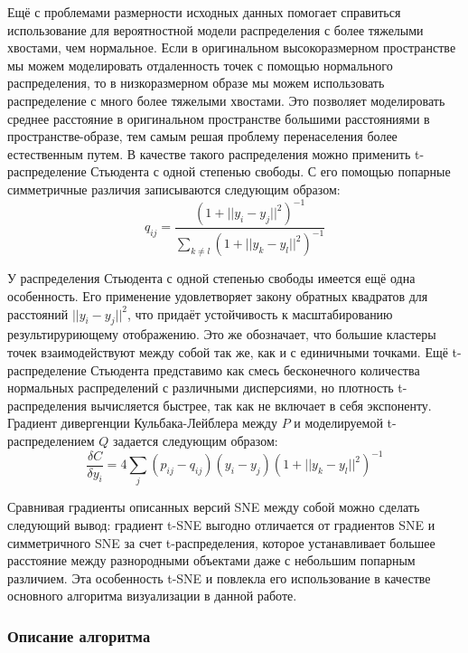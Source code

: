 Ещё с проблемами размерности исходных данных помогает справиться использование для вероятностной модели распределения с более тяжелыми хвостами, чем нормальное. Если в оригинальном высокоразмерном пространстве мы можем моделировать отдаленность точек с помощью нормального распределения, то в низкоразмерном образе мы можем использовать распределение с много более тяжелыми хвостами. Это позволяет моделировать среднее расстояние в оригинальном пространстве большими расстояниями в пространстве-образе, тем самым решая проблему перенаселения более естественным путем. В качестве такого распределения можно применить t-распределение Стьюдента с одной степенью свободы. С его помощью попарные симметричные различия записываются следующим образом:
\begin{equation}
	q_{ij} = \frac{(1 + ||y_i - y_j||^2)^{-1}}{\sum_{k \neq l} (1 + ||y_k - y_l||^2)^{-1}}
\end{equation}

У распределения Стьюдента с одной степенью свободы имеется ещё одна особенность. Его применение удовлетворяет закону обратных квадратов для расстояний $||y_i - y_j||^2$, что придаёт устойчивость к масштабированию результируриющему отображению. Это же обозначает, что большие кластеры точек взаимодействуют между собой так же, как и с единичными точками. Ещё t-распределение Стьюдента представимо как смесь бесконечного количества нормальных распределений с различными дисперсиями, но плотность t-распределения вычисляется быстрее, так как не включает в себя экспоненту. Градиент дивергенции Кульбака-Лейблера между $P$ и моделируемой t-распределением $Q$ задается следующим образом:
\begin{equation}
	\frac{\delta C}{\delta y_i} = 4 \sum_j (p_{ij} - q_{ij})(y_i - y_j)(1 + ||y_k - y_l||^2)^{-1}
\end{equation}

Сравнивая градиенты описанных версий SNE между собой можно сделать следующий вывод: градиент t-SNE выгодно отличается от градиентов SNE и симметричного SNE за счет t-распределения, которое устанавливает большее расстояние между разнородными объектами даже с небольшим попарным различием. Эта особенность t-SNE и повлекла его использование в качестве основного алгоритма визуализации в данной работе.

\subsubsection{Описание алгоритма}

